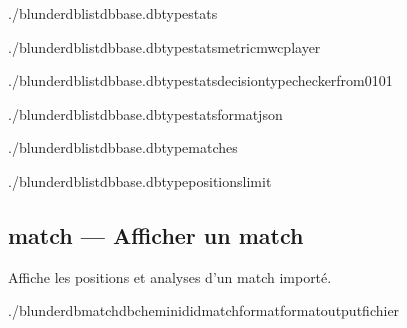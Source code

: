 \documentclass[letterpaper,10pt,french]{sphinxmanual}
\begin{document}
\begin{sphinxVerbatim}[commandchars=\\\{\}]
./blunderdblist\PYGZhy{}\PYGZhy{}dbbase.db\PYGZhy{}\PYGZhy{}typestats

./blunderdblist\PYGZhy{}\PYGZhy{}dbbase.db\PYGZhy{}\PYGZhy{}typestats\PYGZhy{}\PYGZhy{}metricmwc\PYGZhy{}\PYGZhy{}player

./blunderdblist\PYGZhy{}\PYGZhy{}dbbase.db\PYGZhy{}\PYGZhy{}typestats\PYGZhy{}\PYGZhy{}decision\PYGZhy{}typechecker\PYGZhy{}\PYGZhy{}from\PYGZhy{}01\PYGZhy{}01

./blunderdblist\PYGZhy{}\PYGZhy{}dbbase.db\PYGZhy{}\PYGZhy{}typestats\PYGZhy{}\PYGZhy{}formatjson

./blunderdblist\PYGZhy{}\PYGZhy{}dbbase.db\PYGZhy{}\PYGZhy{}typematches

./blunderdblist\PYGZhy{}\PYGZhy{}dbbase.db\PYGZhy{}\PYGZhy{}typepositions\PYGZhy{}\PYGZhy{}limit
\end{sphinxVerbatim}


\subsection{match — Afficher un match}
\label{\detokenize{cli:match-afficher-un-match}}
\sphinxAtStartPar
Affiche les positions et analyses d’un match importé.

\begin{sphinxVerbatim}[commandchars=\\\{\}]
./blunderdbmatch\PYGZhy{}\PYGZhy{}db\PYGZlt{}chemin\PYGZgt{}\PYGZhy{}\PYGZhy{}id\PYGZlt{}id\PYGZus{}match\PYGZgt{}\PYG{o}{[}\PYGZhy{}\PYGZhy{}format\PYGZlt{}format\PYGZgt{}\PYG{o}{]}\PYG{o}{[}\PYGZhy{}\PYGZhy{}output\PYGZlt{}fichier\PYGZgt{}\PYG{o}{]}
\end{sphinxVerbatim}
\end{document}

